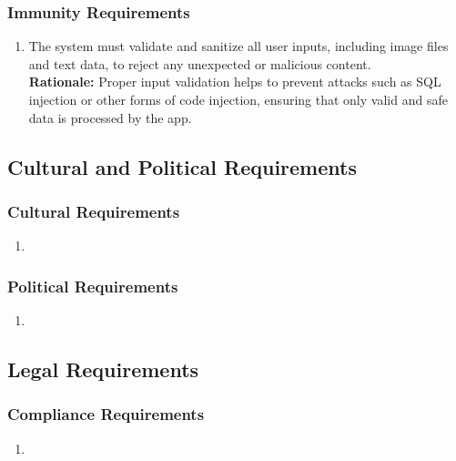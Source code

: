 \documentclass[]{article}
\begin{document}
\begin{enumerate}[{\bf BE1.}]
\subsubsection{Immunity Requirements}
\label{ssub:immunity_requirements}
\begin{enumerate}[{SR-IM}1. ]
	\item The system must validate and sanitize all user inputs, including image files and text data, to reject any unexpected or malicious content.\\
	\textbf{Rationale:} Proper input validation helps to prevent attacks such as SQL injection or other forms of code injection, ensuring that only valid and safe data is processed by the app.
\end{enumerate}


\subsection{Cultural and Political Requirements}
\label{sub:cultural_and_political_requirements}

\subsubsection{Cultural Requirements}
\label{ssub:cultural_requirements}
\begin{enumerate}[{CP-C}1. ]
	\item 
\end{enumerate}

\subsubsection{Political Requirements}
\label{ssub:political_requirements}
\begin{enumerate}[{CP-P}1. ]
	\item 
\end{enumerate}


\subsection{Legal Requirements}
\label{sub:legal_requirements}

\subsubsection{Compliance Requirements}
\label{ssub:compliance_requirements}
\begin{enumerate}[{LR-COMP}1. ]
	\item 
\end{enumerate}


\end{enumerate}
\end{document}
